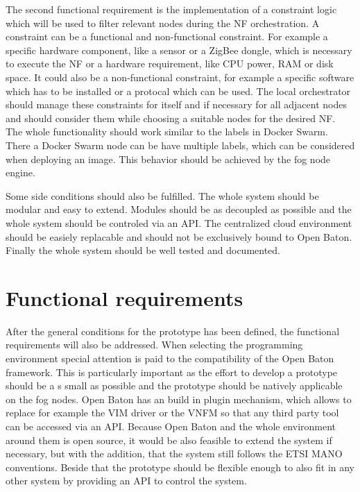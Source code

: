 The second functional requirement is the implementation of a constraint logic which will be used to filter relevant nodes during the \ac{NF} orchestration.
A constraint can be a functional and non-functional constraint.
For example a specific hardware component, like a sensor or a ZigBee dongle, which is necessary to execute the \ac{NF} or a hardware requirement, like \ac{CPU} power, \ac{RAM} or disk space.
It could also be a non-functional constraint, for example a specific software which has to be installed or a protocal which can be used.
The local orchestrator should manage these constraints for itself and if necessary for all adjacent nodes and should consider them while choosing a suitable nodes for the desired \ac{NF}.
The whole functionality should work similar to the labels in Docker Swarm.
There a Docker Swarm node can be have multiple labels, which can be considered when deploying an image.
This behavior should be achieved by the fog node engine.

Some side conditions should also be fulfilled.
The whole system should be modular and easy to extend.
Modules should be as decoupled as possible and the whole system should be controled via an \ac{API}.
The centralized cloud environment should be easiely replacable and should not be exclusively bound to Open Baton.
Finally the whole system should be well tested and documented.


\section{Functional requirements}
\label{section:functional-requirements}
After the general conditions for the prototype has been defined, the functional requirements will also be addressed.
When selecting the programming environment special attention is paid to the compatibility of the Open Baton framework. %
This is particularly important as the effort to develop a prototype should be a s small as possible and the prototype should be natively applicable on the fog nodes.
Open Baton has an build in plugin mechanism, which allows to replace for example the \ac{VIM} driver or the \ac{VNFM} so that any third party tool can be accessed via an \ac{API}.
Because Open Baton and the whole environment around them is open source, it would be also feasible to extend the system if necessary, but with the addition, that the system still follows the \ac{ETSI} \ac{MANO} conventions.
Beside that the prototype should be flexible enough to also fit in any other system by providing an \ac{API} to control the system.

